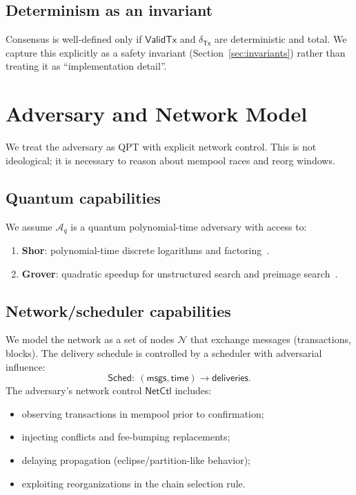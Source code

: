 \documentclass[11pt]{article}
\newcommand{\Aq}{\mathcal{A}_q}
\newcommand{\Tx}{\mathsf{Tx}}
\newcommand{\ValidTx}{\mathsf{ValidTx}}
\newcommand{\DeltaTx}{\delta_{\Tx}}
\begin{document}
\subsection{Determinism as an invariant}
Consensus is well-defined only if $\ValidTx$ and $\DeltaTx$ are deterministic and total.
We capture this explicitly as a safety invariant (Section~\ref{sec:invariants}) rather than treating it as ``implementation detail''.

\section{Adversary and Network Model}\label{sec:threat}

We treat the adversary as QPT with explicit network control.
This is not ideological; it is necessary to reason about mempool races and reorg windows.

\subsection{Quantum capabilities}
We assume $\Aq$ is a quantum polynomial-time adversary with access to:
\begin{enumerate}[leftmargin=2em]
  \item \textbf{Shor}: polynomial-time discrete logarithms and factoring~\cite{shor1994algorithms}.
  \item \textbf{Grover}: quadratic speedup for unstructured search and preimage search~\cite{grover1996fast,zalka1999grover}.
\end{enumerate}

\subsection{Network/scheduler capabilities}
We model the network as a set of nodes $\mathcal{N}$ that exchange messages (transactions, blocks).
The delivery schedule is controlled by a scheduler with adversarial influence:
\[
\mathsf{Sched}:\ (\textsf{msgs},\textsf{time}) \to \textsf{deliveries}.
\]
The adversary's network control $\mathsf{NetCtl}$ includes:
\begin{itemize}[leftmargin=2em]
  \item observing transactions in mempool prior to confirmation;
  \item injecting conflicts and fee-bumping replacements;
  \item delaying propagation (eclipse/partition-like behavior);
  \item exploiting reorganizations in the chain selection rule.
\end{itemize}
\end{document}

